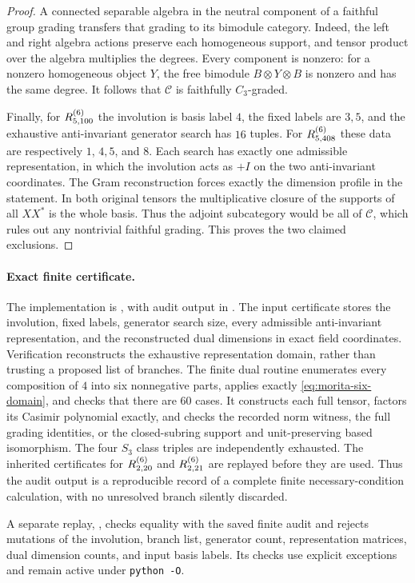 \begin{proof}
A connected separable algebra in the neutral component of a faithful
group grading transfers that grading to its bimodule category. Indeed,
the left and right algebra actions preserve each homogeneous support,
and tensor product over the algebra multiplies the degrees. Every
component is nonzero: for a nonzero homogeneous object $Y$, the free
bimodule $B\otimes Y\otimes B$ is nonzero and has the same degree.
It follows that $\mathcal C$ is faithfully $C_3$-graded.

Finally, for $R^{(6)}_{5,100}$ the involution is basis label $4$, the
fixed labels are $3,5$, and the exhaustive anti-invariant generator
search has $16$ tuples. For $R^{(6)}_{5,408}$ these data are respectively
$1$, $4,5$, and $8$. Each search has exactly one admissible
representation, in which the involution acts as $+I$ on the two
anti-invariant coordinates. The Gram reconstruction forces exactly the
dimension profile in the statement. In both original tensors the
multiplicative closure of the supports of all $XX^*$ is the whole
basis. Thus the adjoint subcategory would be all of $\mathcal C$,
which rules out any nontrivial faithful grading. This proves the two
claimed exclusions.
\end{proof}

\paragraph{Exact finite certificate.}
The implementation is , with
audit output in
.
The input certificate stores the involution, fixed labels, generator
search size, every admissible anti-invariant representation, and the
reconstructed dual dimensions in exact field coordinates. Verification
reconstructs the exhaustive representation domain, rather than trusting
a proposed list of branches. The finite dual routine enumerates every
composition of $4$ into six nonnegative parts, applies exactly
\eqref{eq:morita-six-domain}, and checks that there are $60$ cases.
It constructs each full tensor, factors its Casimir polynomial exactly,
and checks the recorded norm witness, the full grading identities, or
the closed-subring support and unit-preserving based isomorphism.
The four $S_3$ class triples are independently exhausted. The inherited
certificates for $R^{(6)}_{2,20}$ and $R^{(6)}_{2,21}$ are replayed before they
are used. Thus the audit output is a reproducible record of a complete
finite necessary-condition calculation, with no unresolved branch
silently discarded.

A separate replay, ,
checks equality with the saved finite audit and rejects mutations of the
involution, branch list, generator count, representation matrices, dual
dimension counts, and input basis labels. Its checks use explicit
exceptions and remain active under \texttt{python -O}.
